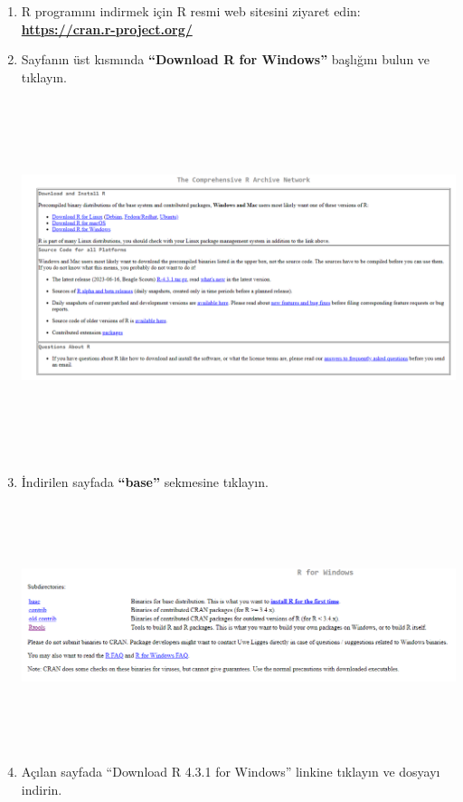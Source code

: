 \documentclass[
  letterpaper,
  DIV=11,
  numbers=noendperiod]{scrreprt}
\begin{document}
\begin{enumerate}
\def\labelenumi{\arabic{enumi}.}
\item
  R programını indirmek için R resmi web sitesini ziyaret edin:
  \href{https://cran.r-project.org/}{\textbf{https://cran.r-project.org/}}
\item
  Sayfanın üst kısmında \textbf{``Download R for Windows''} başlığını
  bulun ve tıklayın.

  \includegraphics[width=6.91667in,height=4.11458in]{images/R download.PNG}
\item
  İndirilen sayfada \textbf{``base''} sekmesine tıklayın.

  \includegraphics[width=6.90625in,height=2.79167in]{images/R download base.PNG}
\item
  Açılan sayfada ``Download R 4.3.1 for Windows'' linkine tıklayın ve
  dosyayı indirin.


\end{enumerate}
\end{document}
